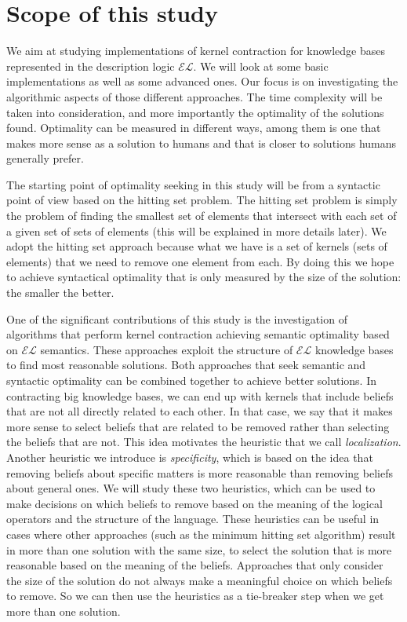 \section{Scope of this study}
We aim at studying implementations of kernel contraction for knowledge bases represented in the description logic $\mathcal{EL}$. We will look at some basic implementations as well as some advanced ones. Our focus is on investigating the algorithmic aspects of those different approaches. The time complexity will be taken into consideration, and more importantly the optimality of the solutions found. Optimality can be measured in different ways, among them is one that makes more sense as a solution to humans and that is closer to solutions humans generally prefer.

The starting point of optimality seeking in this study will be from a syntactic point of view based on the hitting set problem. The hitting set problem is simply the problem of finding the smallest set of elements that intersect with each set of a given set of sets of elements (this will be explained in more details later). We adopt the hitting set approach because what we have is a set of kernels (sets of elements) that we need to remove one element from each. By doing this we hope to achieve syntactical optimality that is only measured by the size of the solution: the smaller the better. 

One of the significant contributions of this study is the investigation of algorithms that perform kernel contraction achieving semantic optimality based on $\mathcal{EL}$ semantics. These approaches exploit the structure of $\mathcal{EL}$ knowledge bases to find most reasonable solutions. Both approaches that seek semantic and syntactic optimality can be combined together to achieve better solutions. In contracting big knowledge bases, we can end up with kernels that include beliefs that are not all directly related to each other. In that case, we say that it makes more sense to select beliefs that are related to be removed rather than selecting the beliefs that are not. This idea motivates the heuristic that we call \textit{localization}. Another heuristic we introduce is \textit{specificity}, which is based on the idea that removing beliefs about specific matters is more reasonable than removing beliefs about general ones. We will study these two heuristics, which can be used to make decisions on which beliefs to remove based on the meaning of the logical operators and the structure of the language. These heuristics can be useful in cases where other approaches (such as the minimum hitting set algorithm) result in more than one solution with the same size, to select the solution that is more reasonable based on the meaning of the beliefs. Approaches that only consider the size of the solution do not always make a meaningful choice on which beliefs to remove. So we can then use the heuristics as a tie-breaker step when we get more than one solution.

